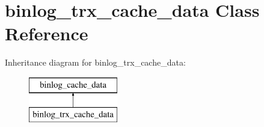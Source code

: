 \hypertarget{classbinlog__trx__cache__data}{}\section{binlog\+\_\+trx\+\_\+cache\+\_\+data Class Reference}
\label{classbinlog__trx__cache__data}
Inheritance diagram for binlog\+\_\+trx\+\_\+cache\+\_\+data\+:\begin{figure}[H]
\begin{center}
\leavevmode
\includegraphics[height=2.000000cm]{classbinlog__trx__cache__data}
\end{center}
\end{figure}

